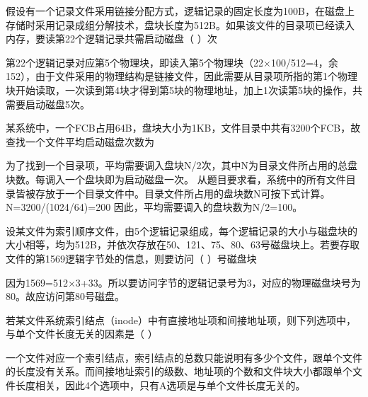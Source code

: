 \question 假设有一个记录文件采用链接分配方式，逻辑记录的固定长度为100B，在磁盘上存储时采用记录成组分解技术，盘块长度为512B。如果该文件的目录项已经读入内存，要读第22个逻辑记录共需启动磁盘（
）次
\par{}
\begin{solution}第22个逻辑记录对应第5个物理块，即读入第5个物理块（22×100/512=4，余152），由于文件采用的物理结构是链接文件，因此需要从目录项所指的第1个物理块开始读取，一次读到第4块才得到第5块的物理地址，加上1次读第5块的操作，共需要启动磁盘5次。
\end{solution}
\question 某系统中，一个FCB占用64B，盘块大小为1KB，文件目录中共有3200个FCB，故查找一个文件平均启动磁盘次数为
\par{}
\begin{solution}为了找到一个目录项，平均需要调入盘块N/2次，其中N为目录文件所占用的总盘块数。每调入一个盘块即为启动磁盘一次。
从题目要求看，系统中的所有文件目录皆被存放于一个目录文件中。目录文件所占用的盘块数N可按下式计算。
N=3200/(1024/64)=200 因此，平均需要调入的盘块数为N/2=100。
\end{solution}
\question 设某文件为索引顺序文件，由5个逻辑记录组成，每个逻辑记录的大小与磁盘块的大小相等，均为512B，并依次存放在50、121、75、80、63号磁盘块上。若要存取文件的第1569逻辑字节处的信息，则要访问（
）号磁盘块
\par{}
\begin{solution}因为1569=512×3+33。所以要访问字节的逻辑记录号为3，对应的物理磁盘块号为80。故应访问第80号磁盘。
\end{solution}
\question 若某文件系统索引结点（inode）中有直接地址项和间接地址项，则下列选项中，与单个文件长度无关的因素是（
）
\par{}
\begin{solution}一个文件对应一个索引结点，索引结点的总数只能说明有多少个文件，跟单个文件的长度没有关系。而间接地址索引的级数、地址项的个数和文件块大小都跟单个文件长度相关，因此4个选项中，只有A选项是与单个文件长度无关的。
\end{solution}
